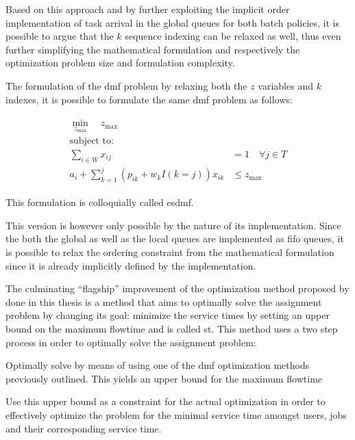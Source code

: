 Based on this approach and by further exploiting the implicit order implementation of task arrival in the global queues for both batch policies, it is possible to argue that the $k$ sequence indexing can be relaxed as well, thus even further simplifying the mathematical formulation and respectively the optimization problem size and formulation complexity.

The formulation of the \gls{dmf} problem by relaxing both the $z$ variables and $k$ indexes, it is possible to formulate the same \gls{dmf} problem as follows:

\begin{align}
	\begin{split}
	    \min_{z_{\text{max}}} \quad z_{\text{max}}\\
	    \text{subject to:} \\
	    \sum_{i \in W} x_{ij} &= 1 \quad \forall j \in T\\
	    a_i + \sum_{k=1}^j (p_{ik} + w_k I(k=j))x_{ik} &\leq z_{\text{max}}
	\end{split}
\end{align}

This formulation is colloquially called \gls{esdmf}.

This version is however only possible by the nature of its implementation. Since the both the global as well as the local queues are implemented as \gls{fifo} queues, it is possible to relax the ordering constraint from the mathematical formulation since it is already implicitly defined by the implementation.

The culminating ``flagship'' improvement of the optimization method proposed by \citet{Zeng2005} done in this thesis is a method that aims to optimally solve the assignment problem by changing its goal: minimize the service times by setting an upper bound on the maximum flowtime and is called \gls{st}. This method uses a two step process in order to optimally solve the assignment problem:
\begin{enumerate*}
	\item Optimally solve by means of using one of the \gls{dmf} optimization methods previously outlined. This yields an upper bound for the maximum flowtime
	\item Use this upper bound as a constraint for the actual optimization in order to effectively optimize the problem for the minimal service time amongst users, jobs and their corresponding service time.
\end{enumerate*}

